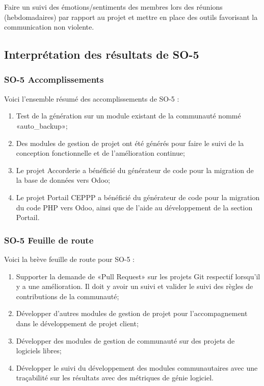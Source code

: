 Faire un suivi des émotions/sentiments des membres lors des réunions (hebdomadaires) par rapport au projet et mettre en place des outils favorisant la communication non violente.

\subsection{Interprétation des résultats de SO-5}

\subsubsection{SO-5 Accomplissements}
Voici l'ensemble résumé des accomplissements de SO-5 :
\begin{enumerate}
    \item Test de la génération sur un module existant de la communauté nommé «auto\_backup»;
    \item Des modules de gestion de projet ont été générés pour faire le suivi de la conception fonctionnelle et de l’amélioration continue;
    \item Le projet Accorderie a bénéficié du générateur de code pour la migration de la base de données vers Odoo;
    \item Le projet Portail CEPPP a bénéficié du générateur de code pour la migration du code PHP vers Odoo, ainsi que de l’aide au développement de la section Portail.
\end{enumerate}

\subsubsection{SO-5 Feuille de route}
Voici la brève feuille de route pour SO-5 :
\begin{enumerate}
    \item Supporter la demande de «Pull Request» sur les projets Git respectif lorsqu’il y a une amélioration. Il doit y avoir un suivi et valider le suivi des règles de contributions de la communauté;
    \item Développer d’autres modules de gestion de projet pour l’accompagnement dans le développement de projet client;
    \item Développer des modules de gestion de communauté sur des projets de logiciels libres;
    \item Développer le suivi du développement des modules communautaires avec une traçabilité sur les résultats avec des métriques de génie logiciel.
\end{enumerate}

